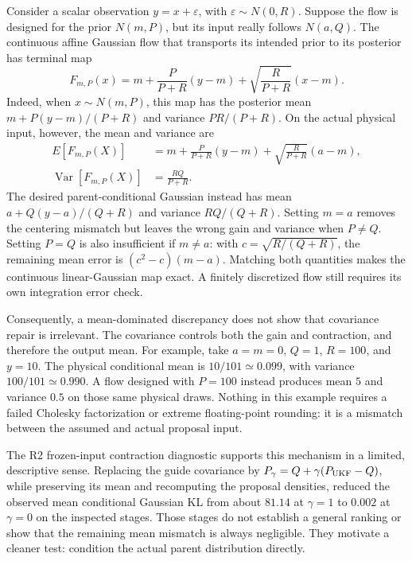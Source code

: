Consider a scalar observation $y=x+\varepsilon$, with
$\varepsilon\sim N(0,R)$. Suppose the flow is designed for the prior $N(m,P)$,
but its input really follows $N(a,Q)$. The continuous affine Gaussian flow that
transports its intended prior to its posterior has terminal map
\begin{equation}
 F_{m,P}(x)=m+\frac{P}{P+R}(y-m)
              +\sqrt{\frac{R}{P+R}}(x-m).
 \label{eq:parent-flow-map}
\end{equation}
Indeed, when $x\sim N(m,P)$, this map has the posterior mean
$m+P(y-m)/(P+R)$ and variance $PR/(P+R)$. On the actual physical input,
however, the mean and variance are
\begin{align}
 E[F_{m,P}(X)]&=m+\frac{P}{P+R}(y-m)
                 +\sqrt{\frac{R}{P+R}}(a-m),\\
 \operatorname{Var}[F_{m,P}(X)]&=\frac{RQ}{P+R}.
 \label{eq:parent-mismatch}
\end{align}
The desired parent-conditional Gaussian instead has mean
$a+Q(y-a)/(Q+R)$ and variance $RQ/(Q+R)$. Setting $m=a$ removes the
centering mismatch but leaves the wrong gain and variance when $P\ne Q$.
Setting $P=Q$ is also insufficient if $m\ne a$: with
$c=\sqrt{R/(Q+R)}$, the remaining mean error is
$(c^2-c)(m-a)$. Matching both quantities makes the continuous linear-Gaussian
map exact. A finitely discretized flow still requires its own integration
error check.

Consequently, a mean-dominated discrepancy does not show that covariance
repair is irrelevant. The covariance controls both the gain and contraction,
and therefore the output mean. For example, take $a=m=0$, $Q=1$, $R=100$,
and $y=10$. The physical conditional mean is $10/101\simeq0.099$, with
variance $100/101\simeq0.990$. A flow designed with $P=100$ instead produces
mean $5$ and variance $0.5$ on those same physical draws. Nothing in this
example requires a failed Cholesky factorization or extreme floating-point
rounding: it is a mismatch between the assumed and actual proposal input.

The R2 frozen-input contraction diagnostic supports this mechanism in a
limited, descriptive sense. Replacing the guide covariance by
$P_\gamma=Q+\gamma(P_{\rm UKF}-Q)$, while preserving its mean and recomputing
the proposal densities, reduced the observed mean conditional Gaussian KL
from about $81.14$ at $\gamma=1$ to $0.002$ at $\gamma=0$ on the inspected
stages. Those stages do not establish a general ranking or show that the
remaining mean mismatch is always negligible. They motivate a cleaner test:
condition the actual parent distribution directly.

